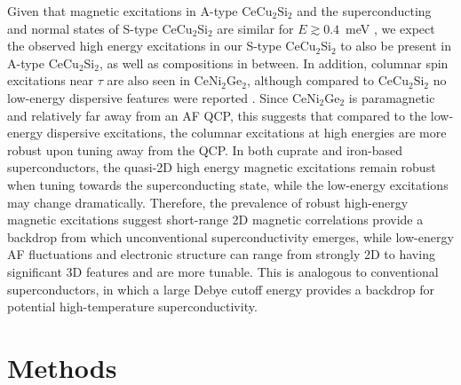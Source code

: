 \documentclass[aps,prl,onecolumn,amsmath,amssymb,superscriptaddress]{revtex4}
\begin{document}
Given that magnetic excitations in  A-type CeCu$_2$Si$_2$ and the superconducting and normal states of S-type CeCu$_2$Si$_2$ are similar for $E\gtrsim0.4$~meV \cite{JArndt2011,ZHuesges2018}, we expect the observed high energy excitations
in our S-type CeCu$_2$Si$_2$ to also be present in A-type CeCu$_2$Si$_2$, as well as compositions in between. In addition, columnar spin excitations near $\tau$ are also seen in CeNi$_2$Ge$_2$, although compared to CeCu$_2$Si$_2$ no low-energy dispersive features were reported \cite{BFak2000}. Since CeNi$_2$Ge$_2$ is paramagnetic and relatively far away from an AF QCP, this suggests that compared to the low-energy dispersive excitations, the columnar excitations at high energies are more robust upon tuning away from the QCP.
In both cuprate and iron-based superconductors, the quasi-2D high energy magnetic excitations remain robust when tuning towards the superconducting state, while the low-energy excitations may change dramatically. Therefore, the prevalence of robust high-energy magnetic excitations suggest short-range 2D magnetic correlations provide a backdrop from which unconventional superconductivity emerges, while low-energy AF fluctuations and electronic structure can range from strongly 2D to having significant 3D features and are more tunable. This is analogous to conventional superconductors, in which a large Debye cutoff energy provides a backdrop for potential high-temperature superconductivity.  

\section{Methods}
\end{document}
